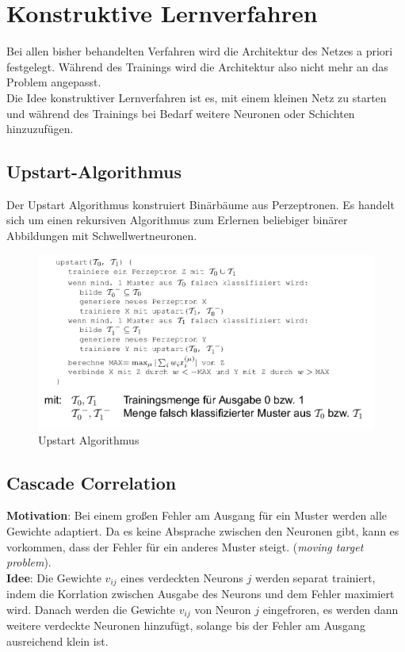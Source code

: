 \section{Konstruktive Lernverfahren}
Bei allen bisher behandelten Verfahren wird die Architektur des Netzes a priori festgelegt. Während des Trainings wird die Architektur also nicht mehr an das Problem angepasst.\\
Die Idee konstruktiver Lernverfahren ist es, mit einem kleinen Netz zu starten und während des Trainings bei Bedarf weitere Neuronen oder Schichten hinzuzufügen.

\subsection{Upstart-Algorithmus}
Der Upstart Algorithmus konstruiert Binärbäume aus Perzeptronen. Es handelt sich um einen rekursiven Algorithmus zum Erlernen beliebiger binärer Abbildungen mit Schwellwertneuronen.\\

\begin{figure}[h]
    \centering
    \includegraphics[width=1\textwidth]{img/NeuroLernregel/upstart.png}
    \caption{Upstart Algorithmus}
    \label{ch_lern_upstart}
\end{figure}

\subsection{Cascade Correlation}
\textbf{Motivation}: Bei einem großen Fehler am Ausgang für ein Muster werden alle Gewichte adaptiert. Da es keine Absprache zwischen den Neuronen gibt, kann es vorkommen, dass der Fehler für ein anderes Muster steigt. (\textit{moving target problem}).\\
\textbf{Idee}: Die Gewichte $v_{ij}$ eines verdeckten Neurons $j$ werden separat trainiert, indem die Korrlation zwischen Ausgabe des Neurons und dem Fehler maximiert wird. Danach werden die Gewichte $v_{ij}$ von Neuron $j$ eingefroren, es werden dann weitere verdeckte Neuronen hinzufügt, solange bis der Fehler am Ausgang ausreichend klein ist. 

